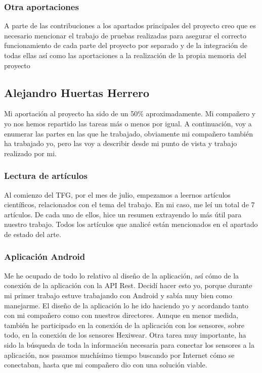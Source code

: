 \documentclass[11pt,spanish]{article}
\begin{document}
\subsubsection{Otra aportaciones}
A parte de las contribuciones a los apartados principales del proyecto creo que es necesario mencionar el trabajo de pruebas realizadas para asegurar el correcto funcionamiento de cada parte del proyecto por separado y de la integración de todas ellas así como las aportaciones a la realización de la propia memoria del proyecto

\subsection{Alejandro Huertas Herrero}
Mi aportación al proyecto ha sido de un 50\% aproximadamente. Mi compañero y yo nos hemos repartido las tareas más o menos por igual. A continuación, voy a enumerar las partes en las que he trabajado, obviamente mi compañero también ha trabajado yo, pero las voy a describir desde mi punto de vista y trabajo realizado por mi.

\subsubsection{Lectura de artículos }
Al comienzo del TFG, por el mes de julio, empezamos a leernos artículos científicos, relacionados con el tema del trabajo. En mi caso, me leí un total de 7 artículos. De cada uno de ellos, hice un resumen extrayendo lo más útil para nuestro trabajo. Todos los artículos que analicé están mencionados en el apartado de estado del arte.

\subsubsection{Aplicación Android} 
Me he ocupado de todo lo relativo al diseño de la aplicación, así cómo de la conexión de la aplicación con la API Rest. Decidí hacer esto yo, porque durante mi primer trabajo estuve trabajando con Android y sabía muy bien como manejarme. El diseño de la aplicación lo he ido haciendo yo y acordando tanto con mi compañero como con nuestros directores. Aunque en menor medida, también he participado en la conexión de la aplicación con los sensores, sobre todo, en la conexión de los sensores Hexiwear. Otra tarea muy importante, ha sido la búsqueda de toda la información necesaria para conectar los sensores a la aplicación, nos pasamos muchísimo tiempo buscando por Internet cómo se conectaban, hasta que mi compañero dio con una solución viable.
    
\end{document}
